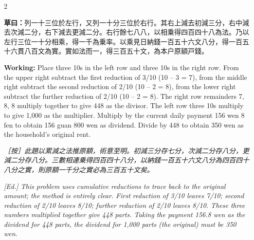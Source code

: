 \documentclass[11pt,a4paper]{article}
\newcommand{\WorkingText}[1]{\par\noindent\textbf{草曰：}#1\par}
\newcommand{\EdNoteText}[1]{\par\noindent\textit{\color{ednotecolor}［按］#1}\par}
\newcommand{\WorkingEn}[1]{\par\noindent\textbf{Working:} #1\par}
\newcommand{\EdNoteEn}[1]{\par\noindent\textit{\color{ednotecolor}[Ed.] #1}\par}
\begin{document}
\begin{paracol}{2}
\WorkingText{列一十三位於左行，又列一十分三位於右行。其右上減去初減三分，右中減去次減二分，右下減去更減二分。右行餘七八八，以相乗得四百四十八為法。乃以左行三位一十分相乘，得一千為乗率。以乘見日納錢一百五十六文八分，得一百五十六貫八百文為實。實如法而一，得三百五十文，為本户原額戸錢。}
\switchcolumn
\WorkingEn{Place three 10s in the left row and three 10s in the right row. From the upper right subtract the first reduction of 3/10 (10 -- 3 = 7), from the middle right subtract the second reduction of 2/10 (10 -- 2 = 8), from the lower right subtract the further reduction of 2/10 (10 -- 2 = 8). The right row remainders 7, 8, 8 multiply together to give 448 as the divisor. The left row three 10s multiply to give 1,000 as the multiplier. Multiply by the current daily payment 156 wen 8 fen to obtain 156 guan 800 wen as dividend. Divide by 448 to obtain 350 wen as the household's original rent.}
\switchcolumn*

\EdNoteText{此題以累減之法推原額，術意至明。初減三分存七分，次減二分存八分，更減二分存八分。三數相連乗得四百四十八分，以納錢一百五十六文八分為四百四十八分之實，則原額一千分之實必為三百五十文矣。}
\switchcolumn
\EdNoteEn{This problem uses cumulative reductions to trace back to the original amount; the method is entirely clear. First reduction of 3/10 leaves 7/10; second reduction of 2/10 leaves 8/10; further reduction of 2/10 leaves 8/10. These three numbers multiplied together give 448 parts. Taking the payment 156.8 wen as the dividend for 448 parts, the dividend for 1,000 parts (the original) must be 350 wen.}

\end{paracol}
\end{document}
